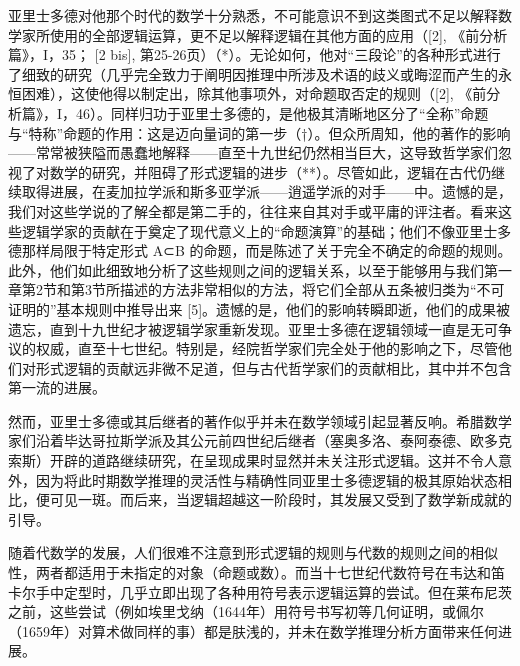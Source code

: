 亚里士多德对他那个时代的数学十分熟悉，不可能意识不到这类图式不足以解释数学家所使用的全部逻辑运算，更不足以解释逻辑在其他方面的应用（{[}2{]}, 《前分析篇》，I，35； {[}2 bis{]}, 第25-26页）（*）。无论如何，他对“三段论”的各种形式进行了细致的研究（几乎完全致力于阐明因推理中所涉及术语的歧义或晦涩而产生的永恒困难），这使他得以制定出，除其他事项外，对命题取否定的规则（{[}2{]}, 《前分析篇》，I，46）。同样归功于亚里士多德的，是他极其清晰地区分了“全称”命题与“特称”命题的作用：这是迈向量词的第一步（†）。但众所周知，他的著作的影响——常常被狭隘而愚蠢地解释——直至十九世纪仍然相当巨大，这导致哲学家们忽视了对数学的研究，并阻碍了形式逻辑的进步（**）。尽管如此，逻辑在古代仍继续取得进展，在麦加拉学派和斯多亚学派——逍遥学派的对手——中。遗憾的是，我们对这些学说的了解全都是第二手的，往往来自其对手或平庸的评注者。看来这些逻辑学家的贡献在于奠定了现代意义上的“命题演算”的基础；他们不像亚里士多德那样局限于特定形式 A⊂B 的命题，而是陈述了关于完全不确定的命题的规则。此外，他们如此细致地分析了这些规则之间的逻辑关系，以至于能够用与我们第一章第2节和第3节所描述的方法非常相似的方法，将它们全部从五条被归类为“不可证明的”基本规则中推导出来 {[}5{]}。遗憾的是，他们的影响转瞬即逝，他们的成果被遗忘，直到十九世纪才被逻辑学家重新发现。亚里士多德在逻辑领域一直是无可争议的权威，直至十七世纪。特别是，经院哲学家们完全处于他的影响之下，尽管他们对形式逻辑的贡献远非微不足道，但与古代哲学家们的贡献相比，其中并不包含第一流的进展。

然而，亚里士多德或其后继者的著作似乎并未在数学领域引起显著反响。希腊数学家们沿着毕达哥拉斯学派及其公元前四世纪后继者（塞奥多洛、泰阿泰德、欧多克索斯）开辟的道路继续研究，在呈现成果时显然并未关注形式逻辑。这并不令人意外，因为将此时期数学推理的灵活性与精确性同亚里士多德逻辑的极其原始状态相比，便可见一斑。而后来，当逻辑超越这一阶段时，其发展又受到了数学新成就的引导。

随着代数学的发展，人们很难不注意到形式逻辑的规则与代数的规则之间的相似性，两者都适用于未指定的对象（命题或数）。而当十七世纪代数符号在韦达和笛卡尔手中定型时，几乎立即出现了各种用符号表示逻辑运算的尝试。但在莱布尼茨之前，这些尝试（例如埃里戈纳（1644年）用符号书写初等几何证明，或佩尔（1659年）对算术做同样的事）都是肤浅的，并未在数学推理分析方面带来任何进展。


